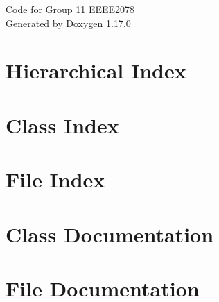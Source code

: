 \documentclass[twoside]{book}
\newcommand{\+}{\discretionary{\mbox{\scriptsize$\hookleftarrow$}}{}{}}
\newcommand{\clearemptydoublepage}{%
    \newpage{\pagestyle{empty}\cleardoublepage}%
  }
\begin{document}
  \raggedbottom
    \hypersetup{pageanchor=false,
                bookmarksnumbered=true,
                pdfencoding=unicode
               }
  \begin{titlepage}
  \vspace*{7cm}
  \begin{center}%
  {\Large Code for Group 11 EEEE2078}\\
  \vspace*{1cm}
  {\large Generated by Doxygen 1.17.0}\\
  \end{center}
  \end{titlepage}
  \clearemptydoublepage
  \tableofcontents
  \clearemptydoublepage
  \hypersetup{pageanchor=true}
\chapter{Hierarchical Index}

\chapter{Class Index}

\chapter{File Index}

\chapter{Class Documentation}





\chapter{File Documentation}















  \backmatter
  \newpage
  \clearemptydoublepage
  \printindex
\end{document}
